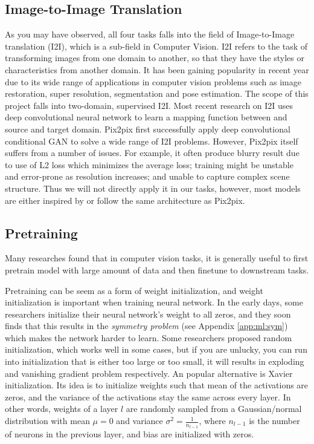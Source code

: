 \subsection{Image-to-Image Translation}
As you may have observed, all four tasks falls into the field of Image-to-Image translation (I2I), which is a sub-field in Computer Vision. I2I refers to the task of transforming images from one domain to another, so that they have the styles or characteristics from another domain. It has been gaining popularity in recent year due to its wide range of applications in computer vision problems such as image restoration, super resolution, segmentation and pose estimation. The scope of this project falls into two-domain, supervised I2I\cite{pangImagetoImageTranslationMethods2021}. Most recent research on I2I uses deep convolutional neural network to learn a mapping function between and source and target domain. Pix2pix\cite{isolaImagetoImageTranslationConditional2018} first successfully apply deep convolutional conditional GAN to solve a wide range of I2I problems. However, Pix2pix itself suffers from a number of issues. For example, it often produce blurry result due to use of L2 loss which minimizes the average loss\cite{wangDiscriminativeRegionProposal2018}; training might be unstable and error-prone as resolution increases\cite{wangHighResolutionImageSynthesis2018}; and unable to capture complex scene structure\cite{tangMultiChannelAttentionSelection2019}. Thus we will not directly apply it in our tasks, however, most models are either inspired by or follow the same architecture as Pix2pix.

\subsection{Pretraining}
Many researches found that in computer vision tasks, it is generally useful to first pretrain model with large amount of data and then finetune to downstream tasks\cite{baoBEiTBERTPreTraining2021, weiMaskedFeaturePrediction2021, newellHowUsefulSelfSupervised2020}.

Pretraining can be seem as a form of weight initialization, and weight initialization is important when training neural network. In the early days, some researchers initialize their neural network's weight to all zeros, and they soon finds that this results in the \textit{symmetry problem} (see Appendix \ref{app:ml:sym}) which makes the network harder to learn. Some researchers proposed random initialization, which works well in some cases, but if you are unlucky, you can run into initialization that is either too large or too small, it will results in exploding and vanishing gradient problem respectively. An popular alternative is Xavier initialization\cite{glorotUnderstandingDifficultyTraining2010}. Its idea is to initialize weights such that mean of the activations are zeros, and the variance of the activations stay the same across every layer. In other words, weights of a layer $l$ are randomly sampled from a Gaussian/normal distribution with mean $\mu = 0$ and variance $\sigma^2=\frac{1}{n_{l-1}}$, where $n_{l-1}$ is the number of neurons in the previous layer, and bias are initialized with zeros.

